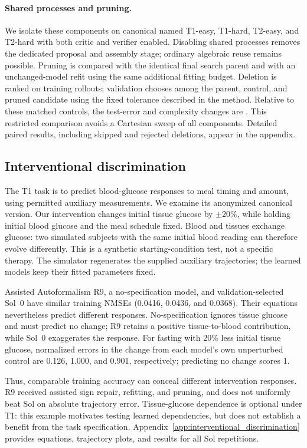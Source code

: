 \paragraph{Shared processes and pruning.}
We isolate these components on canonical named T1-easy, T1-hard, T2-easy, and
T2-hard with both critic and verifier enabled. Disabling shared processes removes
the dedicated proposal and assembly stage; ordinary algebraic reuse remains
possible. Pruning is compared with the identical final search parent and with an
unchanged-model refit using the same additional fitting budget. Deletion is
ranked on training rollouts; validation chooses among the parent, control, and
pruned candidate using the fixed tolerance described in the method.
Relative to these matched controls, the test-error and complexity changes are
.
This restricted comparison avoids a Cartesian sweep of all components. Detailed
paired results, including skipped and rejected deletions, appear in the appendix.

\subsection{Interventional discrimination}
\label{sec:exp_specification_case}

The T1 task is to predict blood-glucose responses to meal timing and amount,
using permitted auxiliary measurements. We examine its anonymized canonical
version. Our intervention changes initial tissue glucose by $\pm20\%$, while
holding initial blood glucose and the meal schedule fixed. Blood and tissues
exchange glucose: two simulated subjects with the same initial blood reading
can therefore evolve differently. This is a synthetic starting-condition test,
not a specific therapy. The simulator regenerates the supplied auxiliary
trajectories; the learned models keep their fitted parameters fixed.

Assisted Autoformalism R9, a no-specification model, and validation-selected
Sol~0 have similar training NMSEs (0.0416, 0.0436, and 0.0368).
Their equations nevertheless predict different responses. No-specification
ignores tissue glucose and must predict no change; R9 retains a positive
tissue-to-blood contribution, while Sol~0 exaggerates the response.
For fasting with 20\% less initial tissue glucose, normalized errors in the
change from each model's own unperturbed control are 0.126, 1.000, and 0.901,
respectively; predicting no change scores 1.

Thus, comparable training accuracy can conceal different intervention responses.
R9 received assisted sign repair, refitting, and pruning, and does not uniformly
beat Sol on absolute trajectory error. Tissue-glucose dependence is optional
under T1: this example motivates testing learned dependencies, but does not
establish a benefit from the task specification. Appendix~\ref{app:interventional_discrimination}
provides equations, trajectory plots, and results for all Sol repetitions.

